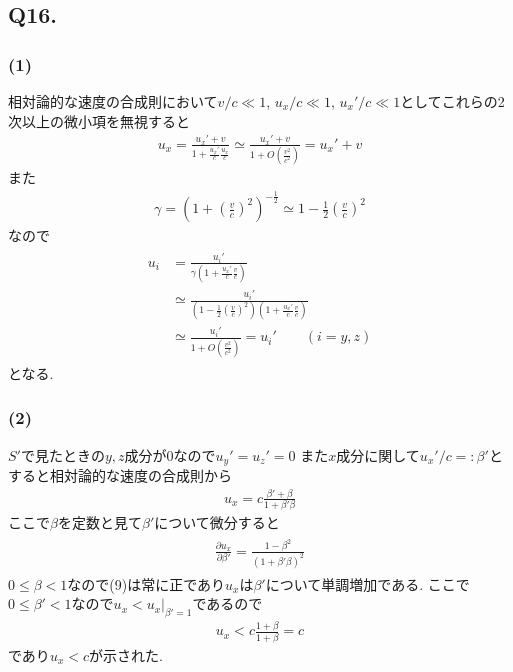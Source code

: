 \documentclass[uplatex,a4j,11pt,dvipdfmx]{jsarticle}
\begin{document}
\subsection*{Q16.}
\subsubsection*{(1)}
相対論的な速度の合成則において$v/c\ll1$, $u_x/c\ll1$, $u_x'/c\ll1$としてこれらの2次以上の微小項を無視すると
\begin{align}
  u_x=\frac{u_x'+v}{1+\frac{u_x'}{c}\frac{u_x}{c}}\simeq\frac{u_x'+v}{1+O(\frac{v^2}{c^2})}=u_x'+v
\end{align}
また
\begin{align}
  \gamma=\left(1+\left(\frac{v}{c}\right)^2\right)^{-\frac{1}{2}}\simeq1-\frac{1}{2}\left(\frac{v}{c}\right)^2
\end{align}
なので
\begin{align}
  \begin{split}
    u_i&=\frac{u_i'}{\gamma\left(1+\frac{u_x'}{c}\frac{v}{c}\right)}\\
    &\simeq\frac{u_i'}{\left(1-\frac{1}{2}\left(\frac{v}{c}\right)^2\right)\left(1+\frac{u_x'}{c}\frac{v}{c}\right)}\\
    &\simeq\frac{u_i'}{1+O(\frac{v^2}{c^2})}=u_i'\qquad (i=y,z)    
  \end{split}
\end{align}
となる.
\subsubsection*{(2)}
$S'$で見たときの$y,z$成分が0なので$u_y'=u_z'=0$
また$x$成分に関して$u_x'/c=:\beta'$とすると相対論的な速度の合成則から
\begin{align}
  u_x=c\frac{\beta'+\beta}{1+\beta'\beta}
\end{align}
ここで$\beta$を定数と見て$\beta'$について微分すると
\begin{align}
  \begin{split}
    \frac{\partial u_x}{\partial \beta'}=\frac{1-\beta^2}{(1+\beta'\beta)^2}
  \end{split}
\end{align}
$0\leq\beta<1$なので(9)は常に正であり$u_x$は$\beta'$について単調増加である.
ここで$0\leq\beta'<1$なので$u_x<u_x|_{\beta'=1}$であるので
\begin{align}
  u_x<c\frac{1+\beta}{1+\beta}=c
\end{align}
であり$u_x<c$が示された.
\end{document}
